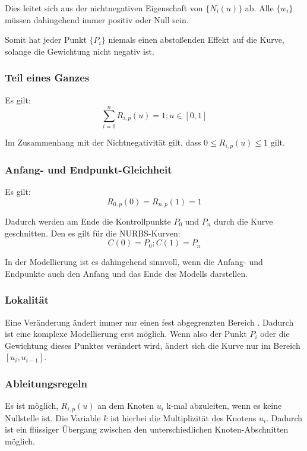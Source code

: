 \documentclass[11pt]{article}
\begin{document}
Dies leitet sich aus der nichtnegativen Eigenschaft von $\{N_{i}(u)\}$ ab.
Alle $\{w_{i}\}$ müssen dahingehend immer positiv oder Null sein.

Somit hat jeder Punkt $\{P_{i}\}$ niemals einen abstoßenden Effekt auf die Kurve, solange die Gewichtung nicht negativ ist.

\subsubsection*{Teil eines Ganzes}
Es gilt:
\begin{equation}
\sum_{i=0}^{n}R_{i,p}(u) = 1; u \in [0,1]
\end{equation}

Im Zusammenhang mit der Nichtnegativität gilt, dass $0 \leq R_{i,p}(u) \leq 1$ gilt.

\subsubsection*{Anfang- und Endpunkt-Gleichheit}
Es gilt:
\begin{equation}
R_{0,p}(0) = R_{n,p}(1) = 1
\end{equation}

Dadurch werden am Ende die Kontrollpunkte $P_{0}$ und $P_{n}$ durch die Kurve geschnitten.
Den es gilt für die NURBS-Kurven:
\begin{equation}
C(0) = P_{0} ; C(1) = P_{n}
\end{equation}

In der Modellierung ist es dahingehend sinnvoll, wenn die Anfang- und Endpunkte auch den Anfang und das Ende des Modells darstellen.

\subsubsection*{Lokalität}
Eine Veränderung ändert immer nur einen fest abgegrenzten Bereich .
Dadurch ist eine komplexe Modellierung erst möglich.
Wenn also der Punkt $P_{i}$ oder die Gewichtung dieses Punktes verändert wird, ändert sich die Kurve nur im Bereich $[u_{i}, u_{i-1}]$.


\subsubsection*{Ableitungsregeln}
Es ist möglich, $R_{i,p}(u)$ an dem Knoten $u_{i}$ k-mal abzuleiten, wenn es keine Nullstelle ist.
Die Variable $k$ ist hierbei die Multiplizität des Knotens $u_{i}$.
Dadurch ist ein flüssiger Übergang zwischen den unterschiedlichen Knoten-Abschnitten möglich.
\end{document}
